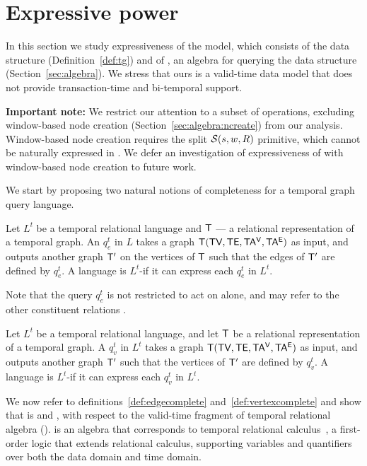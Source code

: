 \section{Expressive power}
\label{sec:formal}

In this section we study expressiveness of the \tg model, which
consists of the \tg data structure (Definition~\ref{def:tg}) and of
\tga, an algebra for querying the data structure
(Section~\ref{sec:algebra}). We stress that ours is a valid-time data
model that does not provide transaction-time and bi-temporal support.

{\bf Important note:} We restrict our attention to a subset of \tga
operations, excluding window-based node creation
(Section~\ref{sec:algebra:ncreate}) from our analysis.  Window-based
node creation requires the split $\mathcal{S}(s,w,R)$ primitive, which
cannot be naturally expressed in \tra.  We defer an investigation of
expressiveness of \tga with window-based node creation to future work.

We start by proposing two natural notions of completeness for a
temporal graph query language.

\begin{definition}
  Let $L^t$ be a temporal relational language and $\mathsf{T}$ --- a
  relational representation of a temporal graph.  An \edgeq $q^t_e$ in
  $L$ takes a graph $\mathsf{T} (\textsf{TV}, \textsf{TE}, \mathsf{TA^{V}}, \mathsf{TA^{E}})$ as input, and
  outputs another graph $\mathsf{T}'$ on the vertices of $\mathsf{T}$ such that
  the edges of $\mathsf{T}'$ are defined by $q^t_e$.  A language is
  $L^t$-\edgec if it can express each $q^t_e$ in $L^t$.
  \label{def:edgecomplete}
\end{definition}

Note that the query $q^t_e$ is not restricted to act on \te alone, and
may refer to the other constituent relations \tve.

\begin{definition}
  Let $L^t$ be a temporal relational language, and let $\mathsf{T}$ be a
  relational representation of a temporal graph.  A \vertexq $q^t_v$
  in $L^t$ takes a graph $\mathsf{T} (\textsf{TV}, \textsf{TE}, \mathsf{TA^{V}}, \mathsf{TA^{E}})$ as input, and
  outputs another graph $\mathsf{T}'$ such that the vertices of $\mathsf{T}'$ are
  defined by $q^t_v$. A language is $L^t$-\vertexc if it can express
  each $q^t_v$ in $L^t$.
\label{def:vertexcomplete}
\end{definition}

We now refer to definitions~\ref{def:edgecomplete}
and~\ref{def:vertexcomplete} and show that \tga is \edgec and
\vertexc, with respect to the valid-time fragment of temporal
relational algebra (\tra).  \tra is an algebra that corresponds to
temporal relational calculus~\cite{DBLP:reference/db/ChomickiT09b}, a
first-order logic that extends relational calculus, supporting
variables and quantifiers over both the data domain and time domain.

